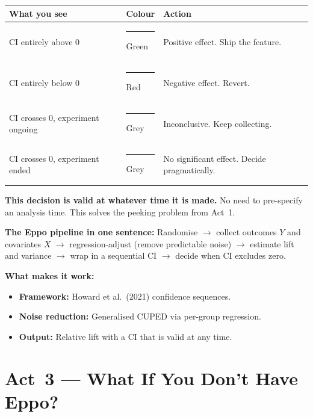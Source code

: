 \documentclass[12pt, a4paper]{article}
\begin{document}
\begin{center}
\renewcommand{\arraystretch}{1.3}
\begin{tabular}{@{} l l p{6.5cm} @{}}
\toprule
\textbf{What you see} & \textbf{Colour} & \textbf{Action} \\
\midrule
CI entirely above 0
  & \textcolor{green!60!black}{\rule{1em}{1em}} Green
  & Positive effect.  Ship the feature. \\
CI entirely below 0
  & \textcolor{red}{\rule{1em}{1em}} Red
  & Negative effect.  Revert. \\
CI crosses 0, experiment ongoing
  & \textcolor{gray}{\rule{1em}{1em}} Grey
  & Inconclusive.  Keep collecting. \\
CI crosses 0, experiment ended
  & \textcolor{gray}{\rule{1em}{1em}} Grey
  & No significant effect.  Decide pragmatically. \\
\bottomrule
\end{tabular}
\end{center}

\textbf{This decision is valid at whatever time it is made.}  No need to
pre-specify an analysis time.  This solves the peeking problem from Act~1.

\begin{keytakeaway}
\textbf{The Eppo pipeline in one sentence:}
Randomise $\to$ collect outcomes $Y$ and covariates $X$ $\to$
regression-adjust (remove predictable noise) $\to$ estimate lift and variance
$\to$ wrap in a sequential CI $\to$ decide when CI excludes zero.

\textbf{What makes it work:}
\begin{itemize}[nosep]
  \item \textbf{Framework:} Howard et al.\ (2021) confidence sequences.
  \item \textbf{Noise reduction:} Generalised CUPED via per-group regression.
  \item \textbf{Output:} Relative lift with a CI that is valid at any time.
\end{itemize}
\end{keytakeaway}


\newpage
\section{Act~3 --- What If You Don't Have Eppo?}
\end{document}
